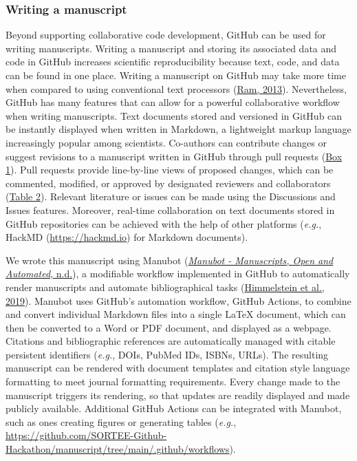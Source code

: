 \hypertarget{writing-a-manuscript}{%
\subsubsection{Writing a manuscript}\label{writing-a-manuscript}}

Beyond supporting collaborative code development, GitHub can be used for writing manuscripts.
Writing a manuscript and storing its associated data and code in GitHub increases scientific reproducibility because text, code, and data can be found in one place.
Writing a manuscript on GitHub may take more time when compared to using conventional text processors (\protect\hyperlink{ref-4ny1onB0}{Ram, 2013}).
Nevertheless, GitHub has many features that can allow for a powerful collaborative workflow when writing manuscripts.
Text documents stored and versioned in GitHub can be instantly displayed when written in Markdown, a lightweight markup language increasingly popular among scientists.
Co-authors can contribute changes or suggest revisions to a manuscript written in GitHub through pull requests (\protect\hyperlink{definitions}{Box 1}).
Pull requests provide line-by-line views of proposed changes, which can be commented, modified, or approved by designated reviewers and collaborators (\protect\hyperlink{tbl:roles}{Table 2}).
Relevant literature or issues can be made using the Discussions and Issues features.
Moreover, real-time collaboration on text documents stored in GitHub repositories can be achieved with the help of other platforms (\emph{e.g.}, HackMD (\url{https://hackmd.io}) for Markdown documents).

We wrote this manuscript using Manubot (\protect\hyperlink{ref-Re6Eg2va}{\emph{Manubot - Manuscripts, Open and Automated}, n.d.}), a modifiable workflow implemented in GitHub to automatically render manuscripts and automate bibliographical tasks (\protect\hyperlink{ref-YuJbg3zO}{Himmelstein et al., 2019}).
Manubot uses GitHub's automation workflow, GitHub Actions, to combine and convert individual Markdown files into a single LaTeX document, which can then be converted to a Word or PDF document, and displayed as a webpage.
Citations and bibliographic references are automatically managed with citable persistent identifiers (\emph{e.g.}, DOIs, PubMed IDs, ISBNs, URLs).
The resulting manuscript can be rendered with document templates and citation style language formatting to meet journal formatting requirements.
Every change made to the manuscript triggers its rendering, so that updates are readily displayed and made publicly available.
Additional GitHub Actions can be integrated with Manubot, such as ones creating figures or generating tables (\emph{e.g.}, \url{https://github.com/SORTEE-Github-Hackathon/manuscript/tree/main/.github/workflows}).

